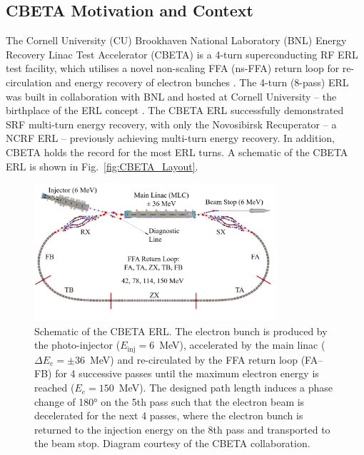 \documentclass[../main.tex]{subfiles}
\begin{document}
\subsection{CBETA Motivation and Context}

The Cornell University (CU) Brookhaven National Laboratory (BNL) Energy Recovery Linac Test Accelerator (CBETA) is a 4-turn superconducting RF ERL test facility, which utilises a novel non-scaling FFA (ns-FFA) return loop for re-circulation and energy recovery of electron bunches \cite{hoffstaetter2017cbeta,bartnik2020cbeta}. The 4-turn (8-pass) ERL was built in collaboration with BNL and hosted at Cornell University -- the birthplace of the ERL concept \cite{tigner1965possible}. The CBETA ERL successfully demonstrated SRF multi-turn energy recovery, with only the Novosibirsk Recuperator \cite{gavrilov2007status} -- a NCRF ERL -- previously achieving multi-turn energy recovery. In addition, CBETA holds the record for the most ERL turns. A schematic of the CBETA ERL is shown in Fig.~\ref{fig:CBETA_Layout}.

\begin{figure}[!h]
\centering
\includegraphics[width=0.8\textwidth]{Figures/CBETA_Multi-Pass_Commissioning/CBETA_4turn.pdf}
\caption{Schematic of the CBETA ERL. The electron bunch is produced by the photo-injector ($E_{\mathrm{inj}} = 6$~\si{\mega\electronvolt}), accelerated by the main linac ($\Delta E_{e} = \pm 36$~\si{\mega\electronvolt}) and re-circulated by the FFA return loop (FA--FB) for 4 successive passes until the maximum electron energy is reached ($E_{e} = 150$~\si{\mega\electronvolt}). The designed path length induces a phase change of 180\si{\degree} on the 5th pass such that the electron beam is decelerated for the next 4 passes, where the electron bunch is returned to the injection energy on the 8th pass and transported to the beam stop. Diagram courtesy of the CBETA collaboration.}
\label{fig:CBETA_layout}
\end{figure}
\end{document}
